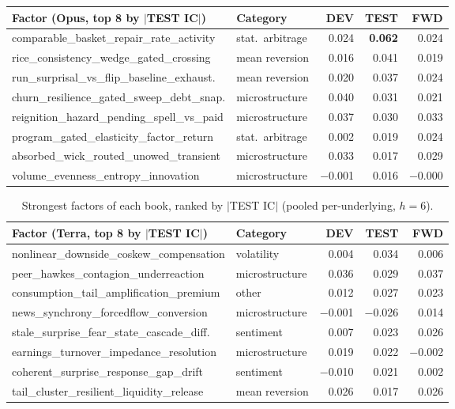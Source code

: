 \documentclass[11pt,a4paper]{article}
\newcommand{\fid}[1]{{\small\ttfamily #1}}
\begin{document}
\begin{table}[H]
\centering\footnotesize
\begin{tabular}{@{}llrrr@{}}
\toprule
\textbf{Factor (Opus, top 8 by $|$TEST IC$|$)} & \textbf{Category} &
\textbf{DEV} & \textbf{TEST} & \textbf{FWD} \\
\midrule
\fid{comparable\_basket\_repair\_rate\_activity}   & stat.\ arbitrage & 0.024 & \textbf{0.062} & 0.024 \\
\fid{rice\_consistency\_wedge\_gated\_crossing}    & mean reversion   & 0.016 & 0.041 & 0.019 \\
\fid{run\_surprisal\_vs\_flip\_baseline\_exhaust.} & mean reversion   & 0.020 & 0.037 & 0.024 \\
\fid{churn\_resilience\_gated\_sweep\_debt\_snap.} & microstructure   & 0.040 & 0.031 & 0.021 \\
\fid{reignition\_hazard\_pending\_spell\_vs\_paid} & microstructure   & 0.037 & 0.030 & 0.033 \\
\fid{program\_gated\_elasticity\_factor\_return}   & stat.\ arbitrage & 0.002 & 0.019 & 0.024 \\
\fid{absorbed\_wick\_routed\_unowed\_transient}    & microstructure   & 0.033 & 0.017 & 0.029 \\
\fid{volume\_evenness\_entropy\_innovation}        & microstructure   & $-$0.001 & 0.016 & $-$0.000 \\
\bottomrule
\end{tabular}
\end{table}

\begin{table}[H]
\centering\footnotesize
\begin{tabular}{@{}llrrr@{}}
\toprule
\textbf{Factor (Terra, top 8 by $|$TEST IC$|$)} & \textbf{Category} &
\textbf{DEV} & \textbf{TEST} & \textbf{FWD} \\
\midrule
\fid{nonlinear\_downside\_coskew\_compensation}    & volatility     & 0.004 & 0.034 & 0.006 \\
\fid{peer\_hawkes\_contagion\_underreaction}       & microstructure & 0.036 & 0.029 & 0.037 \\
\fid{consumption\_tail\_amplification\_premium}    & other          & 0.012 & 0.027 & 0.023 \\
\fid{news\_synchrony\_forcedflow\_conversion}      & microstructure & $-$0.001 & $-$0.026 & 0.014 \\
\fid{stale\_surprise\_fear\_state\_cascade\_diff.} & sentiment      & 0.007 & 0.023 & 0.026 \\
\fid{earnings\_turnover\_impedance\_resolution}    & microstructure & 0.019 & 0.022 & $-$0.002 \\
\fid{coherent\_surprise\_response\_gap\_drift}     & sentiment      & $-$0.010 & 0.021 & 0.002 \\
\fid{tail\_cluster\_resilient\_liquidity\_release} & mean reversion & 0.026 & 0.017 & 0.026 \\
\bottomrule
\end{tabular}
\caption{Strongest factors of each book, ranked by $|$TEST IC$|$ (pooled
per-underlying, $h=6$).}
\end{table}
\end{document}
